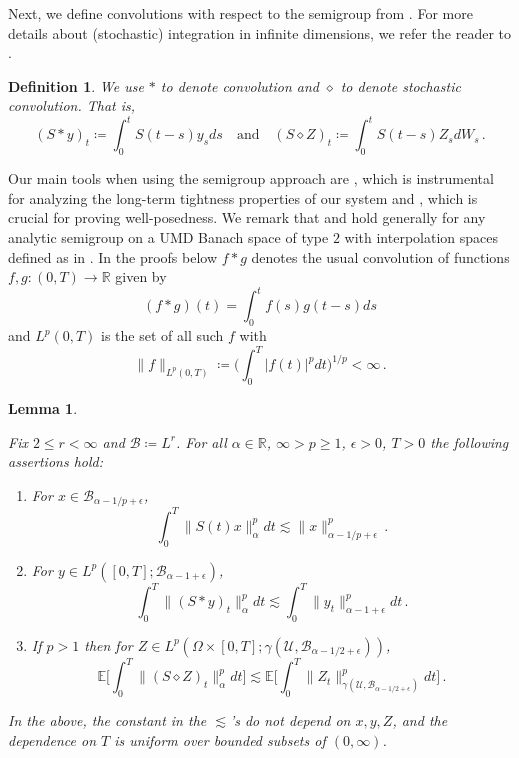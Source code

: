\documentclass[final]{amsart}
\newtheorem{deff}[thm]{Definition}
\newtheorem{lem}[thm]{Lemma}
\numberwithin{thm}{section}
\numberwithin{equation}{section}
\newcommand{\E}{\mathbb{E}}
\newcommand{\U}{\mathcal{U}}
\newcommand{\R}{\mathbb{R}}
\newcommand{\B}{\mathcal{B}}
\begin{document}
Next, we define convolutions with respect to the semigroup from . For more details about (stochastic) integration in infinite dimensions, we refer the reader to \cite{umd-integration, umd-existence}.

\begin{deff}
    We use $*$ to denote convolution and $\diamond$ to denote stochastic convolution. That is,
    \begin{equation}\label{convolutions}
        (S * y)_t \coloneqq \int_0^tS(t-s)y_sds \quad \text{and} \quad (S \diamond Z)_t \coloneqq \int_0^t S(t-s)Z_sdW_s \,.
    \end{equation}
\end{deff}

Our main tools when using the semigroup approach are 
, which is instrumental for analyzing the long-term tightness properties of our system 
and , which is 
crucial for proving well-posedness.
We remark that  and    hold generally for any analytic semigroup on a UMD Banach space of type $2$ with interpolation spaces defined as in \cite[Definition 5.30]{hairer-notes}. In the proofs below $f*g$  denotes the usual convolution 
of functions $f,g: (0,T) \to \R$ given by 
$$
(f*g)(t) = \int_0^tf(s)g(t-s)ds
$$
and $L^p(0,T)$ is  
the set of all such $f$ with 
$$
\|f\|_{L^p(0,T)} \coloneqq \Big(\int_0^T |f(t)|^pdt\Big)^{1/p} < \infty \,.
$$


\begin{lem}\label{convolution-bounds}
    
    Fix $2 \leq r < \infty$ and $\B \coloneqq L^r$. For all $\alpha \in \R$, $\infty > p \geq 1$, $\epsilon > 0$, $T > 0$ the following assertions hold:
    \begin{enumerate}[label=(\roman*)]
        \item For $x \in \B_{\alpha - 1/p + \epsilon}$,
        $$\int_0^T \|S(t)x\|^p_\alpha dt \lesssim \|x\|_{\alpha - 1/p + \epsilon}^p \,.$$
        \item For $y \in L^p([0,T]; \B_{\alpha - 1 + \epsilon})$,
        $$\int_0^T \|(S * y)_t\|^p_\alpha dt \lesssim \int_0^T \|y_t\|^p_{\alpha - 1 + \epsilon} dt \,.$$
        \item If $p > 1$ then for $Z \in L^p(\Omega \times [0,T];\gamma(\U, \B_{\alpha - 1/2 + \epsilon}))$,
        $$\E\Big[\int_0^T \|(S \diamond Z)_t\|^p_\alpha dt\Big] \lesssim \E\Big[\int_0^T \|Z_t\|^p_{\gamma(\U,\B_{\alpha - 1/2 + \epsilon})} dt\Big] \,.$$
    \end{enumerate}
    In the above, the constant in the $\lesssim$'s do not depend on $x,y,Z$, and the dependence on $T$ is uniform over bounded subsets of $(0,\infty)$.
\end{lem}
\end{document}
